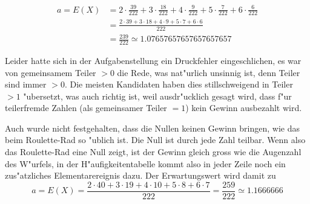 \begin{loesung}
\begin{teilaufgaben}
\begin{align*}
a=E(X)&=2\cdot \frac{39}{222}+3\cdot\frac{18}{222}+4\cdot\frac{9}{222}
+5\cdot\frac{7}{222}+6\cdot\frac6{222}
\\
&=\frac{
2\cdot 39+3\cdot 18+4\cdot 9+5\cdot 7 +6\cdot 6
}{222}
\\
&=\frac{ 239 }{222}
\simeq 1.07657657657657657657
\end{align*}
\end{teilaufgaben}
Leider hatte sich in der Aufgabenstellung ein Druckfehler eingeschlichen,
es war von gemeinsamem Teiler $> 0$ die Rede, was nat"urlich unsinnig ist,
denn Teiler sind immer $> 0$. Die meisten Kandidaten haben dies stillschweigend
in Teiler $>1$ "ubersetzt, was auch richtig ist, weil ausdr"ucklich
gesagt wird, dass f"ur teilerfremde Zahlen (als gemeinsamer Teiler $= 1$)
kein Gewinn ausbezahlt wird.

Auch wurde nicht festgehalten,
dass die Nullen keinen Gewinn bringen, wie das beim Roulette-Rad so
"ublich ist. Die Null ist durch jede Zahl teilbar. Wenn also das Roulette-Rad
eine Null zeigt, ist der Gewinn gleich gross wie die Augenzahl des W"urfels,
in der H"aufigkeitentabelle kommt also in jeder Zeile noch ein zus"atzliches
Elementarereignis dazu. Der Erwartungswert wird damit zu
\[
a=E(X)=
\frac{2\cdot 40+3\cdot 19+4\cdot 10+5\cdot 8+6\cdot 7}{222}
=
\frac{259}{222}
\simeq
1.1666666
\]
\end{loesung}

